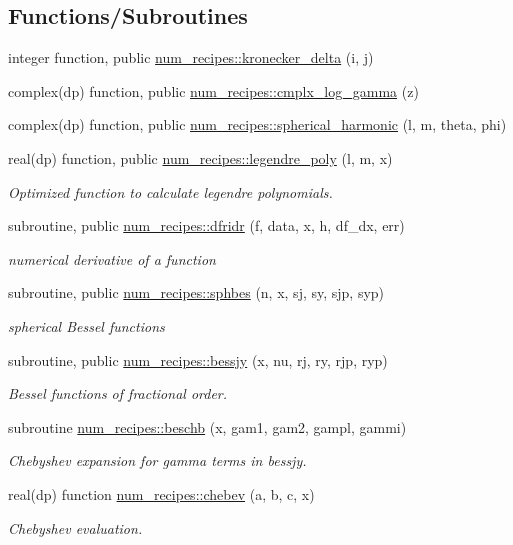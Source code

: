 \subsection*{Functions/\+Subroutines}
\begin{DoxyCompactItemize}
\item 
integer function, public \hyperlink{namespacenum__recipes_a866cf4a4cf4693c7f6f56dd5ecbaf0c5}{num\+\_\+recipes\+::kronecker\+\_\+delta} (i, j)
\item 
complex(dp) function, public \hyperlink{namespacenum__recipes_a024b1f51e277f9765e4ea2160090bc8c}{num\+\_\+recipes\+::cmplx\+\_\+log\+\_\+gamma} (z)
\item 
complex(dp) function, public \hyperlink{namespacenum__recipes_ac4a87c3daeeb45285208250fd3f27d4a}{num\+\_\+recipes\+::spherical\+\_\+harmonic} (l, m, theta, phi)
\item 
real(dp) function, public \hyperlink{namespacenum__recipes_abb39707356349ecadb66e01014f12520}{num\+\_\+recipes\+::legendre\+\_\+poly} (l, m, x)
\begin{DoxyCompactList}\small\item\em Optimized function to calculate legendre polynomials. \end{DoxyCompactList}\item 
subroutine, public \hyperlink{namespacenum__recipes_a35e9f30262aeb7588bf205c2b018abd4}{num\+\_\+recipes\+::dfridr} (f, data, x, h, df\+\_\+dx, err)
\begin{DoxyCompactList}\small\item\em numerical derivative of a function \end{DoxyCompactList}\item 
subroutine, public \hyperlink{namespacenum__recipes_a1dfc128c6203c9e7bede17caa5fbb828}{num\+\_\+recipes\+::sphbes} (n, x, sj, sy, sjp, syp)
\begin{DoxyCompactList}\small\item\em spherical Bessel functions \end{DoxyCompactList}\item 
subroutine, public \hyperlink{namespacenum__recipes_ad8ad468d2545789939deec75dd273d93}{num\+\_\+recipes\+::bessjy} (x, nu, rj, ry, rjp, ryp)
\begin{DoxyCompactList}\small\item\em Bessel functions of fractional order. \end{DoxyCompactList}\item 
subroutine \hyperlink{namespacenum__recipes_a361c889af1a90696af2e7b68b7ea8fd7}{num\+\_\+recipes\+::beschb} (x, gam1, gam2, gampl, gammi)
\begin{DoxyCompactList}\small\item\em Chebyshev expansion for gamma terms in bessjy. \end{DoxyCompactList}\item 
real(dp) function \hyperlink{namespacenum__recipes_a798cfb76aca4655f8cc33fcfa19683d7}{num\+\_\+recipes\+::chebev} (a, b, c, x)
\begin{DoxyCompactList}\small\item\em Chebyshev evaluation. \end{DoxyCompactList}\end{DoxyCompactItemize}
